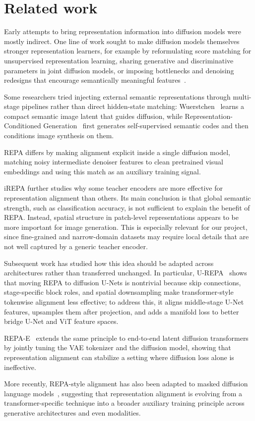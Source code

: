 \section{Related work}

Early attempts to bring representation information into diffusion models were mostly indirect. One line of work sought to make diffusion models themselves stronger representation learners, for example by reformulating score matching for unsupervised representation learning, sharing generative and discriminative parameters in joint diffusion models, or imposing bottlenecks and denoising redesigns that encourage semantically meaningful features~\cite{mittal2024diffusionbasedrepresentationlearning,deja2023learning,Hudson_2024_CVPR,chen2024deconstructing}.

Some researchers tried injecting external semantic representations through multi-stage pipelines rather than direct hidden-state matching: Wuerstchen~\cite{pernias2024wuerstchen} learns a compact semantic image latent that guides diffusion, while Representation-Conditioned Generation~\cite{li2024rcg} first generates self-supervised semantic codes and then conditions image synthesis on them.

REPA differs by making alignment explicit inside a single diffusion model, matching noisy intermediate denoiser features to clean pretrained visual embeddings and using this match as an auxiliary training signal.

iREPA further studies why some teacher encoders are more effective for representation alignment than others. Its main conclusion is that global semantic strength, such as classification accuracy, is not sufficient to explain the benefit of REPA. Instead, spatial structure in patch-level representations appears to be more important for image generation. This is especially relevant for our project, since fine-grained and narrow-domain datasets may require local details that are not well captured by a generic teacher encoder.

Subsequent work has studied how this idea should be adapted across architectures rather than transferred unchanged. In particular, U-REPA~\cite{tian2025urepa} shows that moving REPA to diffusion U-Nets is nontrivial because skip connections, stage-specific block roles, and spatial downsampling make transformer-style tokenwise alignment less effective; to address this, it aligns middle-stage U-Net features, upsamples them after projection, and adds a manifold loss to better bridge U-Net and ViT feature spaces.

REPA-E~\cite{leng2025repae} extends the same principle to end-to-end latent diffusion transformers by jointly tuning the VAE tokenizer and the diffusion model, showing that representation alignment can stabilize a setting where diffusion loss alone is ineffective.

More recently, REPA-style alignment has also been adapted to masked diffusion language models~\cite{junior2026accelerating}, suggesting that representation alignment is evolving from a transformer-specific technique into a broader auxiliary training principle across generative architectures and even modalities.
